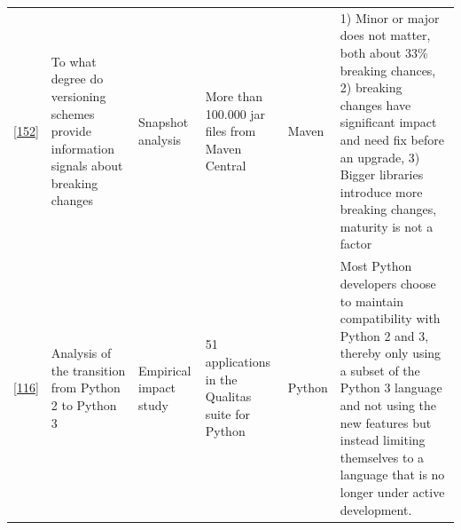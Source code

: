 \documentclass[]{book}
\begin{document}
\begin{longtable}[]{@{}llllll@{}}
\begin{minipage}[t]{0.10\columnwidth}
{[}\protect\hyperlink{ref-Raemaekers2017}{152}{]}\strut
\end{minipage} & \begin{minipage}[t]{0.18\columnwidth}\raggedright\strut
To what degree do versioning schemes provide information signals about
breaking changes\strut
\end{minipage} & \begin{minipage}[t]{0.19\columnwidth}\raggedright\strut
Snapshot analysis\strut
\end{minipage} & \begin{minipage}[t]{0.11\columnwidth}\raggedright\strut
More than 100.000 jar files from Maven Central\strut
\end{minipage} & \begin{minipage}[t]{0.13\columnwidth}\raggedright\strut
Maven\strut
\end{minipage} & \begin{minipage}[t]{0.11\columnwidth}\raggedright\strut
1) Minor or major does not matter, both about 33\% breaking chances, 2)
breaking changes have significant impact and need fix before an upgrade,
3) Bigger libraries introduce more breaking changes, maturity is not a
factor\strut
\end{minipage}\tabularnewline
\begin{minipage}[t]{0.10\columnwidth}\raggedright\strut
{[}\protect\hyperlink{ref-Malloy2018}{116}{]}\strut
\end{minipage} & \begin{minipage}[t]{0.18\columnwidth}\raggedright\strut
Analysis of the transition from Python 2 to Python 3\strut
\end{minipage} & \begin{minipage}[t]{0.19\columnwidth}\raggedright\strut
Empirical impact study\strut
\end{minipage} & \begin{minipage}[t]{0.11\columnwidth}\raggedright\strut
51 applications in the Qualitas suite for Python\strut
\end{minipage} & \begin{minipage}[t]{0.13\columnwidth}\raggedright\strut
Python\strut
\end{minipage} & \begin{minipage}[t]{0.11\columnwidth}\raggedright\strut
Most Python developers choose to maintain compatibility with Python 2
and 3, thereby only using a subset of the Python 3 language and not
using the new features but instead limiting themselves to a language
that is no longer under active development.\strut

\end{minipage}
\end{longtable}
\end{document}
